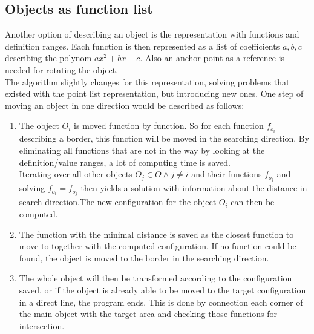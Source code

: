\subsection{Objects as function list}
Another option of describing an object is the representation with functions and definition ranges. Each function is then represented as a list of coefficients $a,b,c$ describing the polynom $ax^2 + bx + c$. Also an anchor point as a reference is needed for rotating the object.\\
The algorithm slightly changes for this representation, solving problems that existed with the point list representation, but introducing new ones. One step of moving an object in one direction would be described as follows:
\begin{enumerate}
\item The object $O_i$ is moved function by function. So for each function $f_{o_i}$ describing a border, this function will be moved in the searching direction. By eliminating all functions that are not in the way by looking at the definition/value ranges, a lot of computing time is saved.\\ 
Iterating over all other objects $O_j \in O \wedge j \neq i$ and their functions $f_{o_j}$ and solving $f_{o_i} = f_{o_j}$ then yields a solution with information about the distance in search direction.The new configuration for the object $O_i$ can then be computed.
\item The function with the minimal distance is saved as the closest function to move to together with the computed configuration. If no function could be found, the object is moved to the border in the searching direction.
\item The whole object will then be transformed according to the configuration saved, or if the object is already able to be moved to the target configuration in a direct line, the program ends. This is done by connection each corner of the main object with the target area and checking those functions for intersection.
\end{enumerate}


